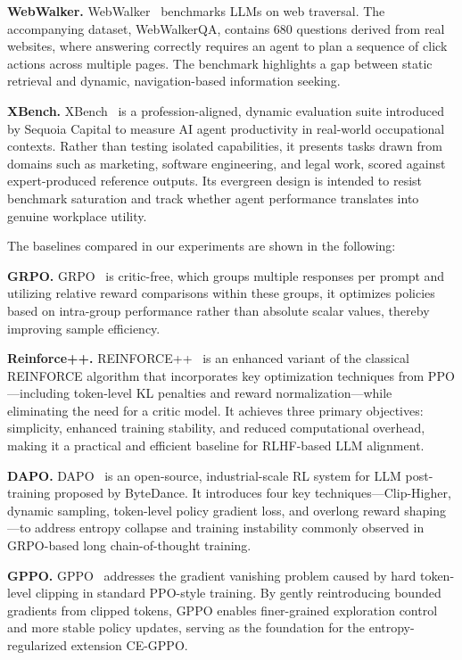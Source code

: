 \documentclass{article}
\begin{document}
\noindent\textbf{WebWalker.} WebWalker~\cite{wu2025webwalker} benchmarks LLMs on web traversal. The accompanying dataset, WebWalkerQA, contains 680 questions derived from real websites, where answering correctly requires an agent to plan a sequence of click actions across multiple pages. The benchmark highlights a gap between static retrieval and dynamic, navigation-based information seeking.

\noindent\textbf{XBench.} XBench~\cite{chen2025xbench} is a profession-aligned, dynamic evaluation suite introduced by Sequoia Capital to measure AI agent productivity in real-world occupational contexts. Rather than testing isolated capabilities, it presents tasks drawn from domains such as marketing, software engineering, and legal work, scored against expert-produced reference outputs. Its evergreen design is intended to resist benchmark saturation and track whether agent performance translates into genuine workplace utility.

The baselines compared in our experiments are shown in the following:

 

\noindent\textbf{GRPO.} GRPO~\cite{guo2025deepseek} is critic-free, which groups multiple responses per prompt and utilizing relative reward comparisons within these groups, it optimizes policies based on intra-group performance rather than absolute scalar values, thereby improving sample efficiency.

\noindent\textbf{Reinforce++.}  REINFORCE++~\cite{hu2025reinforce++} is an enhanced variant of the classical REINFORCE algorithm that incorporates key optimization techniques from PPO—including token-level KL penalties and reward normalization—while eliminating the need for a critic model. It achieves three primary objectives: simplicity, enhanced training stability, and reduced computational overhead, making it a practical and efficient baseline for RLHF-based LLM alignment.

\noindent\textbf{DAPO.} DAPO~\cite{yu2025dapo}  is an open-source, industrial-scale RL system for LLM post-training proposed by ByteDance. It introduces four key techniques—Clip-Higher, dynamic sampling, token-level policy gradient loss, and overlong reward shaping—to address entropy collapse and training instability commonly observed in GRPO-based long chain-of-thought training.

\noindent\textbf{GPPO.} GPPO~\cite{su2025klear}  addresses the gradient vanishing problem caused by hard token-level clipping in standard PPO-style training. By gently reintroducing bounded gradients from clipped tokens, GPPO enables finer-grained exploration control and more stable policy updates, serving as the foundation for the entropy-regularized extension CE-GPPO.
\end{document}

